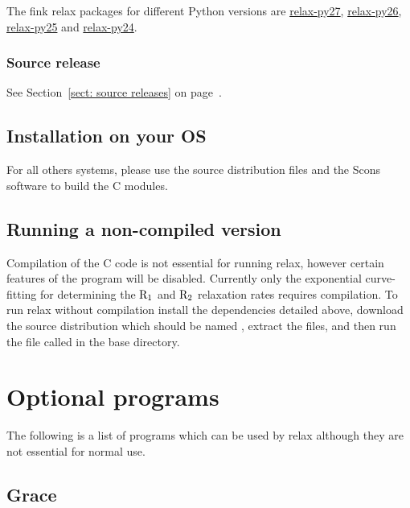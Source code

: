 The fink relax packages for different Python versions are \href{http://pdb.finkproject.org/pdb/package.php/relax-py27}{relax-py27}, \href{http://pdb.finkproject.org/pdb/package.php/relax-py26}{relax-py26}, \href{http://pdb.finkproject.org/pdb/package.php/relax-py25}{relax-py25} and \href{http://pdb.finkproject.org/pdb/package.php/relax-py24}{relax-py24}.

\subsubsection{Source release}

See Section~\ref{sect: source releases} on page~\pageref{sect: source releases}.


\subsection{Installation on your OS}

For all others systems, please use the source distribution files and the Scons software to build the C modules.



\subsection{Running a non-compiled version}

Compilation of the C code is not essential for running relax, however certain features of the program will be disabled.
Currently only the exponential curve-fitting for determining the $\mathrm{R}_1$ and $\mathrm{R}_2$ relaxation rates requires compilation.
To run relax without compilation install the dependencies detailed above, download the source distribution which should be named , extract the files, and then run the file called  in the base directory.




\section{Optional programs}

The following is a list of programs which can be used by relax although they are not essential for normal use.


\subsection{Grace}

